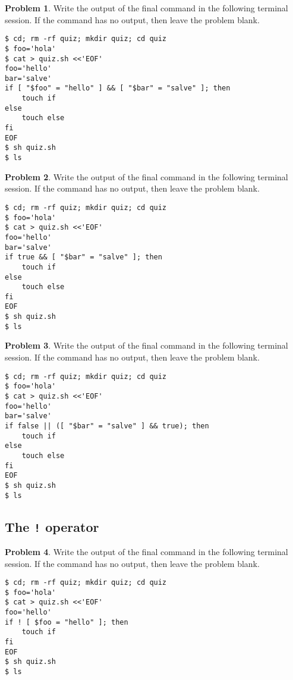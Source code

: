 \documentclass[10pt]{article}
\theoremstyle{definition}
\newtheorem{problem}{Problem}
\begin{document}
\filbreak
\begin{problem}
    Write the output of the final command in the following terminal session.
    If the command has no output, then leave the problem blank.
\end{problem}
\begin{lstlisting}
$ cd; rm -rf quiz; mkdir quiz; cd quiz
$ foo='hola'
$ cat > quiz.sh <<'EOF'
foo='hello'
bar='salve'
if [ "$foo" = "hello" ] && [ "$bar" = "salve" ]; then
    touch if
else
    touch else
fi
EOF
$ sh quiz.sh
$ ls
\end{lstlisting}

\filbreak
\begin{problem}
    Write the output of the final command in the following terminal session.
    If the command has no output, then leave the problem blank.
\end{problem}
\begin{lstlisting}
$ cd; rm -rf quiz; mkdir quiz; cd quiz
$ foo='hola'
$ cat > quiz.sh <<'EOF'
foo='hello'
bar='salve'
if true && [ "$bar" = "salve" ]; then
    touch if
else
    touch else
fi
EOF
$ sh quiz.sh
$ ls
\end{lstlisting}

\filbreak
\begin{problem}
    Write the output of the final command in the following terminal session.
    If the command has no output, then leave the problem blank.
\end{problem}
\begin{lstlisting}
$ cd; rm -rf quiz; mkdir quiz; cd quiz
$ foo='hola'
$ cat > quiz.sh <<'EOF'
foo='hello'
bar='salve'
if false || ([ "$bar" = "salve" ] && true); then
    touch if
else
    touch else
fi
EOF
$ sh quiz.sh
$ ls
\end{lstlisting}

\filbreak
\subsection{The \lstinline{!} operator}

\begin{problem}
    Write the output of the final command in the following terminal session.
    If the command has no output, then leave the problem blank.
\end{problem}
\begin{lstlisting}
$ cd; rm -rf quiz; mkdir quiz; cd quiz
$ foo='hola'
$ cat > quiz.sh <<'EOF'
foo='hello'
if ! [ $foo = "hello" ]; then
    touch if
fi
EOF
$ sh quiz.sh
$ ls
\end{lstlisting}
\end{document}
